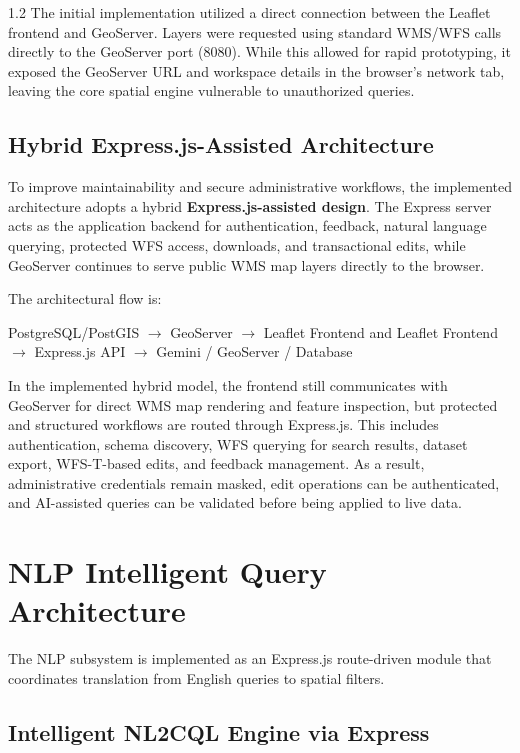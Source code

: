 \begin{spacing}{1.2}
The initial implementation utilized a direct connection between the Leaflet frontend and GeoServer. Layers were requested using standard WMS/WFS calls directly to the GeoServer port (8080). While this allowed for rapid prototyping, it exposed the GeoServer URL and workspace details in the browser's network tab, leaving the core spatial engine vulnerable to unauthorized queries.

\subsection{Hybrid Express.js-Assisted Architecture}

To improve maintainability and secure administrative workflows, the implemented architecture adopts a hybrid \textbf{Express.js-assisted design}. The Express server acts as the application backend for authentication, feedback, natural language querying, protected WFS access, downloads, and transactional edits, while GeoServer continues to serve public WMS map layers directly to the browser.

The architectural flow is:
\begin{center}
PostgreSQL/PostGIS $\rightarrow$ GeoServer $\rightarrow$ Leaflet Frontend
\newline
and
\newline
Leaflet Frontend $\rightarrow$ Express.js API $\rightarrow$ Gemini / GeoServer / Database
\end{center}

In the implemented hybrid model, the frontend still communicates with GeoServer for direct WMS map rendering and feature inspection, but protected and structured workflows are routed through Express.js. This includes authentication, schema discovery, WFS querying for search results, dataset export, WFS-T-based edits, and feedback management. As a result, administrative credentials remain masked, edit operations can be authenticated, and AI-assisted queries can be validated before being applied to live data.

\section{NLP Intelligent Query Architecture}

The NLP subsystem is implemented as an Express.js route-driven module that coordinates translation from English queries to spatial filters.

\subsection{Intelligent NL2CQL Engine via Express}


\end{spacing}
